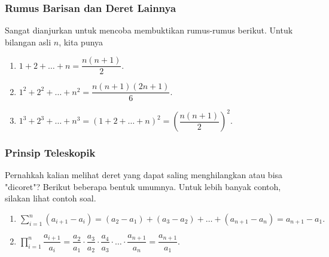 \subsubsection{Rumus Barisan dan Deret Lainnya}
Sangat dianjurkan untuk mencoba membuktikan rumus-rumus berikut. Untuk bilangan asli $n$, kita punya
\begin{enumerate}
    \item $1+2+\dots+n = \dfrac{n(n+1)}{2}.$
    \item $1^2+2^2+\dots+n^2 = \dfrac{n(n+1)(2n+1)}{6}.$
    \item $1^3+2^3+\dots+n^3 = \left(1+2+\dots+n\right)^2= \left(\dfrac{n(n+1)}{2}\right)^2.$
\end{enumerate}

\subsubsection{Prinsip Teleskopik}
Pernahkah kalian melihat deret yang dapat saling menghilangkan atau bisa "dicoret"? Berikut beberapa bentuk umumnya. Untuk lebih banyak contoh, silakan lihat contoh soal.

\begin{enumerate}
    \item $\sum_{i=1}^{n} (a_{i+1}-a_{i}) = (a_2-a_1)+(a_3-a_2)+\dots+(a_{n+1}-a_{n}) = a_{n+1}-a_1.$
    \item $\prod_{i=1}^{n} \dfrac{a_{i+1}}{a_i} =  \dfrac{a_2}{a_1}\cdot\dfrac{a_3}{a_2}\cdot\dfrac{a_4}{a_3}\cdot\ldots\cdot\dfrac{a_{n+1}}{a_n} = \dfrac{a_{n+1}}{a_1}.$
\end{enumerate}